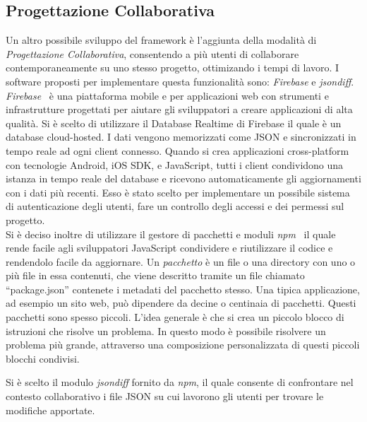 \subsection{Progettazione Collaborativa}
\label{sec:conclusions_section_2_sub_2}
Un altro possibile sviluppo del framework è l'aggiunta della modalità di \emph{Progettazione Collaborativa}, consentendo a più utenti
di collaborare contemporaneamente su uno stesso progetto, ottimizando i tempi di lavoro.
I software proposti per implementare questa funzionalità sono:
\emph{Firebase} e \emph{jsondiff}.\\
\emph{Firebase}~\cite{firebase} è una piattaforma mobile e per applicazioni web con strumenti e infrastrutture progettati
per aiutare gli sviluppatori a creare applicazioni di alta qualità. Si è scelto di utilizzare
il Database Realtime di Firebase  il quale è un database cloud-hosted. I dati vengono memorizzati come JSON e
sincronizzati in tempo reale ad ogni client connesso. Quando si crea applicazioni cross-platform con
tecnologie Android, iOS SDK, e JavaScript, tutti i client condividono una istanza in tempo reale del
database e ricevono automaticamente gli aggiornamenti con i dati più recenti.
Esso è stato scelto per implementare un possibile sistema di autenticazione degli utenti,
fare un controllo degli accessi e dei permessi sul progetto.\\
Si è deciso inoltre di utilizzare il gestore di pacchetti e moduli \emph{npm}~\cite{npm} il quale rende facile agli sviluppatori
JavaScript condividere e riutilizzare il codice e rendendolo facile da aggiornare.
Un \emph{pacchetto} è un file o una directory con uno o più file in essa contenuti, che viene descritto tramite un file chiamato ``package.json''
contenete i metadati del pacchetto stesso. Una tipica applicazione, ad esempio un sito web, può dipendere da decine o centinaia di pacchetti.
Questi pacchetti sono spesso piccoli. L'idea generale è che si crea un piccolo blocco di istruzioni che risolve un problema.
In questo modo è possibile risolvere un problema più grande, attraverso una composizione personalizzata di questi piccoli
blocchi condivisi.
\newpage

Si è scelto il modulo \emph{jsondiff} fornito da \emph{npm}, il quale consente di confrontare nel contesto collaborativo
i file JSON su cui lavorono gli utenti per trovare le modifiche apportate.\\

